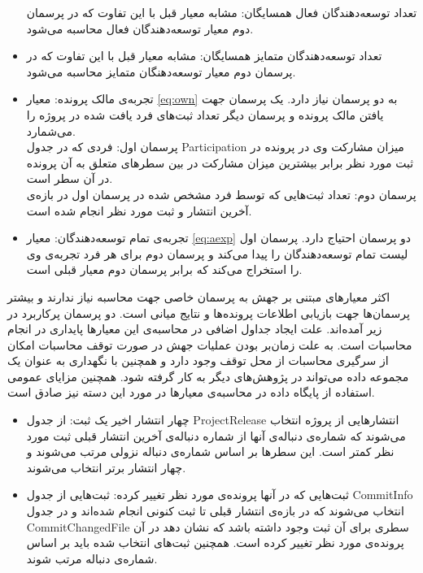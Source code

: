 \begin{itemize}
تعداد توسعه‌دهندگان فعال همسایگان: مشابه معیار قبل با این تفاوت که در پرسمان دوم معیار توسعه‌دهندگان فعال محاسبه می‌شود.
\item
تعداد توسعه‌دهندگان متمایز همسایگان: مشابه معیار قبل با این تفاوت که در پرسمان دوم معیار توسعه‌دهنگان متمایز محاسبه می‌شود.
\item
تجربه‌ی مالک پرونده:  معیار  \ref{eq:own} به دو پرسمان نیاز دارد. یک پرسمان جهت یافتن مالک پرونده و پرسمان دیگر تعداد ثبت‌های فرد یافت شده در پروژه را می‌شمارد. \\
پرسمان اول: فردی که در جدول Participation میزان مشارکت وی در پرونده در ثبت مورد نظر برابر بیشترین میزان مشارکت در بین سطرهای متعلق به آن پرونده در آن سطر است.\\
پرسمان دوم: تعداد ثبت‌هایی که توسط فرد مشخص شده در پرسمان اول در بازه‌ی آخرین انتشار و  ثبت مورد نظر انجام شده است. 
\item
تجربه‌ی تمام توسعه‌دهندگان:   معیار  \ref{eq:aexp} دو پرسمان احتیاج دارد. پرسمان اول لیست تمام توسعه‌دهندگان را پیدا می‌کند و پرسمان دوم برای هر فرد تجربه‌ی وی را استخراج می‌کند که برابر پرسمان دوم معیار قبلی است. 

\end{itemize}
 
اکثر معیارهای مبتنی بر جهش به پرسمان خاصی جهت محاسبه نیاز ندارند و بیشتر پرسمان‌ها جهت بازیابی اطلاعات پرونده‌ها و نتایج میانی است. دو پرسمان پرکاربرد در زیر آمده‌اند. علت ایجاد جداول اضافی در محاسبه‌ی  این معیارها پایداری در انجام محاسبات است.  به علت زمان‌بر بودن عملیات جهش  در صورت توقف محاسبات امکان از سرگیری محاسبات از محل توقف وجود  دارد و همچنین  با نگهداری به عنوان یک مجموعه داده می‌تواند در پژوهش‌های دیگر به کار گرفته شود. همچنین مزایای عمومی استفاده از پایگاه داده در محاسبه‌ی معیارها در مورد این دسته نیز صادق است. 

\begin{itemize}
\item
	 چهار انتشار اخیر یک ثبت: از جدول ProjectRelease انتشارهایی از پروژه انتخاب می‌شوند که شماره‌ی دنباله‌ی آنها از شماره‌ دنباله‌ی  آخرین انتشار قبلی ثبت مورد نظر کمتر است. این سطر‌ها بر اساس  شماره‌ی دنباله نزولی مرتب می‌شوند و چهار انتشار برتر انتخاب می‌شوند. 
\item
ثبت‌هایی که در آنها پرونده‌ی مورد نظر تغییر کرده: ثبت‌هایی از جدول CommitInfo انتخاب می‌شوند که در بازه‌ی انتشار قبلی تا ثبت کنونی انجام شده‌اند و در جدول CommitChangedFile سطری برای آن ثبت وجود داشته باشد که نشان دهد در آن پرونده‌ی مورد نظر تغییر کرده است. همچنین ثبت‌های انتخاب شده باید بر اساس شماره‌ی دنباله مرتب شوند. 
	 
\end{itemize}

